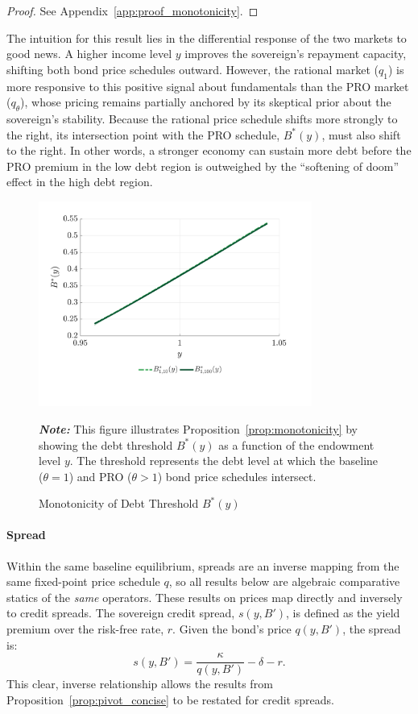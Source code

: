 \documentclass[12pt]{article}
\theoremstyle{plain}
\begin{document}
\begin{proof}
	See Appendix~\ref{app:proof_monotonicity}.
\end{proof}
The intuition for this result lies in the differential response of the two markets to good news. A higher income level $y$ improves the sovereign's repayment capacity, shifting both bond price schedules outward. However, the rational market ($q_1$) is more responsive to this positive signal about fundamentals than the PRO market ($q_\theta$), whose pricing remains partially anchored by its skeptical prior about the sovereign's stability. Because the rational price schedule shifts more strongly to the right, its intersection point with the PRO schedule, $B^*(y)$, must also shift to the right. In other words, a stronger economy can sustain more debt before the PRO premium in the low debt region is outweighed by the ``softening of doom'' effect in the high debt region.

\begin{figure}[htb]
	\centering
	\includegraphics[width=0.8\textwidth]{../../pro-default-model/results/comparison_figure_10.pdf}
	\caption{Monotonicity of Debt Threshold $B^*(y)$}
	\label{fig:monotonicity}
	\parbox{\textwidth}{\small\textit{\textbf{Note:} }This figure illustrates Proposition~\ref{prop:monotonicity} by showing the debt threshold $B^*(y)$ as a function of the endowment level $y$. The threshold represents the debt level at which the baseline ($\theta=1$) and PRO ($\theta>1$) bond price schedules intersect.}
\end{figure}

\paragraph{Spread}
Within the same baseline equilibrium, spreads are an inverse mapping from the
same fixed-point price schedule $q$, so all results below are algebraic
comparative statics of the \emph{same} operators. These results on prices map
directly and inversely to credit spreads. The sovereign credit spread, $s(y,
	B')$, is defined as the yield premium over the risk-free rate, $r$. Given the
bond's price $q(y, B')$, the spread is:
\begin{equation}
	s(y, B') = \frac{\kappa}{q(y, B')} - \delta - r.
	\label{eq:spread_definition}
\end{equation}
This clear, inverse relationship allows the results from Proposition~\ref{prop:pivot_concise} to be restated for credit spreads.
\end{document}
